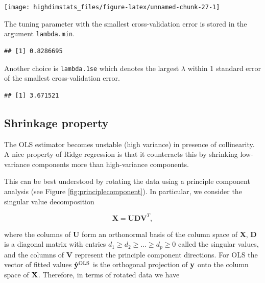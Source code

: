 \documentclass[
]{book}
\newenvironment{Shaded}{\begin{snugshade}}{\end{snugshade}}
\newcommand{\FloatTok}[1]{\textcolor[rgb]{0.00,0.00,0.81}{#1}}
\newcommand{\NormalTok}[1]{#1}
\newcommand{\SpecialCharTok}[1]{\textcolor[rgb]{0.00,0.00,0.00}{#1}}
\begin{document}
\begin{center}\texttt{[image: highdimstats\_files/figure-latex/unnamed-chunk-27-1]} \end{center}

The tuning parameter with the smallest cross-validation error is stored in the argument \texttt{lambda.min}.

\begin{Shaded}
\end{Shaded}

\begin{verbatim}
## [1] 0.8286695
\end{verbatim}

Another choice is \texttt{lambda.1se} which denotes the largest \(\lambda\) within 1 standard error of the smallest cross-validation error.

\begin{Shaded}
\end{Shaded}

\begin{verbatim}
## [1] 3.671521
\end{verbatim}

\hypertarget{shrinkage-property}{%
\subsection{Shrinkage property}\label{shrinkage-property}}

The OLS estimator becomes unstable (high variance) in presence of collinearity. A nice property of Ridge regression is that it counteracts this by shrinking low-variance components more than high-variance components.

This can be best understood by rotating the data using a principle component analysis (see Figure \ref{fig:principlecomponent}). In particular, we consider the singular value decomposition

\[\textbf{X}=\textbf{U}\textbf{D}\textbf{V}^T,\]

where the columns of \(\textbf{U}\) form an orthonormal basis of the column space of \(\textbf{X}\), \(\textbf{D}\) is a diagonal matrix with entries \(d_1\geq d_2\geq\ldots\geq d_p \geq 0\) called the singular values, and the columns of \(\textbf{V}\) represent the principle component directions. For OLS the vector of fitted values \({\bf \hat y}^{\rm OLS}\) is the orthogonal projection of \({\bf y}\) onto the column space of \(\bf X\). Therefore, in terms of rotated data we have
\end{document}
